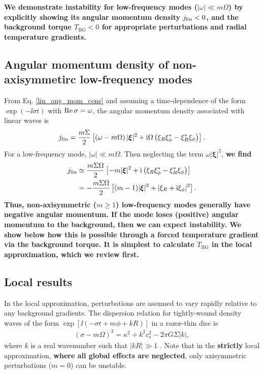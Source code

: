{\bf 
  We demonstrate instability for low-frequency modes 
  ($|\omega|\ll m\Omega$) by explicitly showing its 
  angular momentum density 
  $j_\mathrm{lin}<0$, and the background torque $T_\mathrm{BG}<0$ for
  appropriate perturbations and radial temperature gradients. 
}

\subsection{Angular momentum density of  non-axisymmetirc low-frequency modes}
From Eq. \ref{lin_ang_mom_cons} and assuming a time-dependence of the
form $\exp{(-\ii \sigma t)}$ with $\operatorname{Re}{\sigma} = \omega$,  
the angular momentum density associated with linear waves is
\begin{align}
  j_\mathrm{lin} = \frac{m\Sigma}{2}\left[\left(\omega -
      m\Omega\right)|\bm{\xi}|^2 + \mathrm{i}\Omega\left(\xi_R\xi_\phi^* -
      \xi_R^*\xi_\phi\right)\right].\label{ang_mom_def}  
\end{align}
For a low-frequency mode, $|\omega|\ll m\Omega$. Then neglecting the
term $\omega|\bm{\xi}|^2$, {\bf we find}
\begin{align}
  j_\mathrm{lin} &\simeq \frac{m\Sigma\Omega}{2}\left[-m|\bm{\xi}|^2 + \mathrm{i}\left(\xi_R\xi_\phi^* -
      \xi_R^*\xi_\phi\right)\right]\notag\\
  & = -\frac{m\Sigma\Omega}{2}\left[ (m-1)|\bm{\xi}|^2 +  |\xi_R + \mathrm{i}\xi_\phi|^2\right].
\end{align}
{\bf
Thus, non-axisymmetric ($m\geq1$) low-frequency modes generally have 
negative angular momentum. If the mode loses (positive) angular momentum 
to the background, then we can expect instability. We show 
below how this is possible through a forced temperature
gradient via the background torque. It is simplest to calculate
$T_\mathrm{BG}$ in the local approximation, which we review first.  
}


\subsection{Local results}\label{local_approx}
In the local approximation, perturbations are assumed to vary rapidly
relative to any background gradients. The
dispersion relation for tightly-wound density 
waves of the form $\exp{[\ii(-\sigma t + m \phi + kR)]}$ in a razor-thin
disc is  
\begin{align}\label{dispersion}
  (\sigma - m\Omega)^2 = \kappa^2 + k^2c_s^2 - 2\pi G \Sigma |k|, 
\end{align}
where $k$ is a real wavenumber such that $|kR|\gg1$ \citep{shu91}. 
Note that in the {\bf strictly} local approximation, {\bf where all
  global effects are neglected}, only axisymmetric perturbations
($m=0$) can be unstable. %

